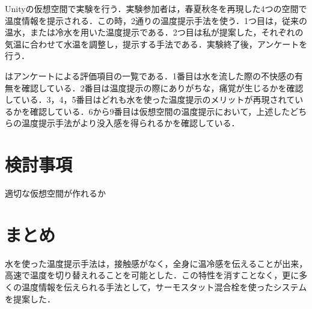 \documentclass[uplatex]{jsarticle}   %
\begin{document}
Unityの仮想空間で実験を行う．実験参加者は，春夏秋冬を再現した4つの空間で温度情報を提示される．この時，2通りの温度提示手法を使う．1つ目は，従来の温水，または冷水を用いた温度提示である．2つ目は私が提案した，それぞれの気温に合わせて水温を調整し，提示する手法である．実験終了後，アンケートを行う．

はアンケートによる評価項目の一覧である．1番目は水を流した際の不快感の有無を確認している．2番目は温度提示の際にありがちな，痛覚が生じるかを確認している．3，4，5番目はどれも水を使った温度提示のメリットが再現されているかを確認している．6から9番目は仮想空間の温度提示において，上述したどちらの温度提示手法がより没入感を得られるかを確認している．


\section{検討事項}
適切な仮想空間が作れるか

\section{まとめ}
水を使った温度提示手法は，接触感がなく，全身に温冷感を伝えることが出来，高速で温度を切り替えれることを可能とした．この特性を消すことなく，更に多くの温度情報を伝えられる手法として，サーモスタット混合栓を使ったシステムを提案した．





\end{document}
